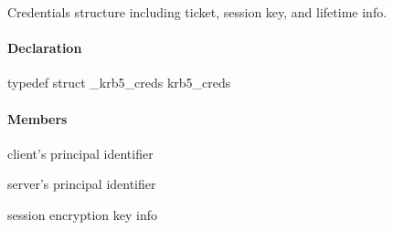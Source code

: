 \documentclass[letterpaper,10pt,english]{sphinxmanual}
\begin{document}
Credentials structure including ticket, session key, and lifetime info.


\paragraph{Declaration}
\label{appdev/refs/types/krb5_creds:declaration}
typedef struct \_krb5\_creds  krb5\_creds


\paragraph{Members}
\label{appdev/refs/types/krb5_creds:members}

\begin{fulllineitems}
\label{appdev/refs/types/krb5_creds:krb5_creds.magic}
\end{fulllineitems}


\begin{fulllineitems}
\label{appdev/refs/types/krb5_creds:krb5_creds.client}
client's principal identifier

\end{fulllineitems}


\begin{fulllineitems}
\label{appdev/refs/types/krb5_creds:krb5_creds.server}
server's principal identifier

\end{fulllineitems}


\begin{fulllineitems}
\label{appdev/refs/types/krb5_creds:krb5_creds.keyblock}
session encryption key info

\end{fulllineitems}

\end{document}
